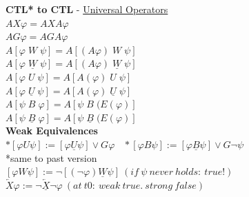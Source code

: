 \documentclass{article}
\begin{document}
\begin{multicols}{4}
\textbf{CTL* to CTL} - \underline{Universal Operators}\\
$AX\varphi = AXA \varphi$\\
$AG\varphi = AGA\varphi$\\
$A[\varphi\; W \; \psi]=A[(A\varphi)\; W \;\psi]$\\
$A[\varphi\; \underline{W} \; \psi]=A[(A\varphi)\; \underline{W} \;\psi]$\\
$A[\varphi\; U \; \psi]=A[A(\varphi) \; U \;\psi]$\\
$A[\varphi\; \underline{U} \; \psi]=A[A(\varphi) \; \underline{U} \;\psi]$\\
$A[\psi\; B \; \varphi]=A[\psi\; B \;(E(\varphi)]$\\
$A[\psi\; \underline{B} \; \varphi]=A[\psi\; \underline{B} \;(E(\varphi)]$\\

\textbf{Weak Equivalences} \\
$*[\varphi U \psi] := [\varphi \underline{U} \psi] \vee G\varphi \ \ \ \ *[\varphi B \psi] := [\varphi \underline{B} \psi] \vee G\neg\psi$ \\
*same to past version \\
$[\varphi W \psi] := \neg[(\neg\varphi) \underline{W} \psi]\ (if\ \psi\ never\ holds:\ true!)$ \\
$\overleftarrow{X}\varphi := \neg\overleftarrow{\underline{X}}\neg\varphi\ (at\ t0:\ weak\ true.\ strong\ false) $ \\


\end{multicols}
\end{document}
